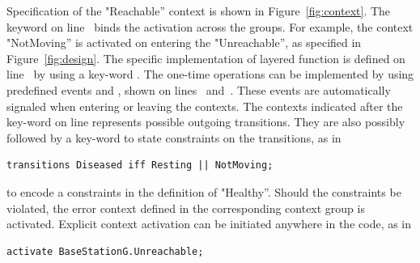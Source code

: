 Specification of the "Reachable'' context is shown in Figure~\ref{fig:context}.
The keyword  on line~ binds the activation
across the groups. For example, the context "NotMoving'' is activated on
entering the "Unreachable'', as specified in Figure~\ref{fig:design}. The
specific implementation of layered function is defined on line~
by using a key-word . The one-time operations can be implemented
by using predefined events  and , shown on
lines~ and~. These events are
automatically signaled when entering or leaving the contexts. The contexts
indicated after the key-word  on line 
represents possible outgoing transitions. They are also possibly followed by a
key-word  to state constraints on the transitions, as in

\begin{lstlisting}[language=conesc]
transitions Diseased iff Resting || NotMoving;
\end{lstlisting}

to encode a constraints in the definition of "Healthy''. Should the constraints
be violated, the error context defined in the corresponding context group is
activated. Explicit context activation can be initiated anywhere in the code, as
in

\begin{lstlisting}[language=conesc]
activate BaseStationG.Unreachable;
\end{lstlisting}
